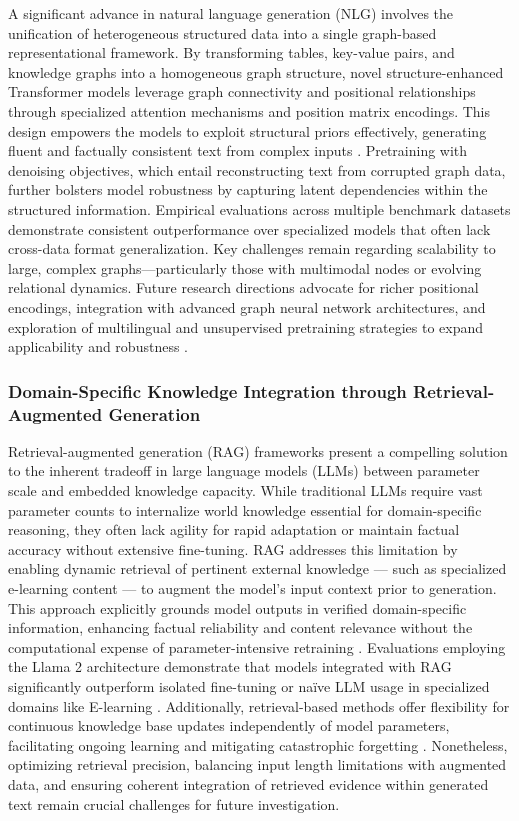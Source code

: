 A significant advance in natural language generation (NLG) involves the unification of heterogeneous structured data into a single graph-based representational framework. By transforming tables, key-value pairs, and knowledge graphs into a homogeneous graph structure, novel structure-enhanced Transformer models leverage graph connectivity and positional relationships through specialized attention mechanisms and position matrix encodings. This design empowers the models to exploit structural priors effectively, generating fluent and factually consistent text from complex inputs \cite{ref46}. Pretraining with denoising objectives, which entail reconstructing text from corrupted graph data, further bolsters model robustness by capturing latent dependencies within the structured information. Empirical evaluations across multiple benchmark datasets demonstrate consistent outperformance over specialized models that often lack cross-data format generalization. Key challenges remain regarding scalability to large, complex graphs---particularly those with multimodal nodes or evolving relational dynamics. Future research directions advocate for richer positional encodings, integration with advanced graph neural network architectures, and exploration of multilingual and unsupervised pretraining strategies to expand applicability and robustness \cite{ref46}.

\subsubsection{Domain-Specific Knowledge Integration through Retrieval-Augmented Generation}

Retrieval-augmented generation (RAG) frameworks present a compelling solution to the inherent tradeoff in large language models (LLMs) between parameter scale and embedded knowledge capacity. While traditional LLMs require vast parameter counts to internalize world knowledge essential for domain-specific reasoning, they often lack agility for rapid adaptation or maintain factual accuracy without extensive fine-tuning. RAG addresses this limitation by enabling dynamic retrieval of pertinent external knowledge --- such as specialized e-learning content --- to augment the model’s input context prior to generation. This approach explicitly grounds model outputs in verified domain-specific information, enhancing factual reliability and content relevance without the computational expense of parameter-intensive retraining \cite{ref8}. Evaluations employing the Llama 2 architecture demonstrate that models integrated with RAG significantly outperform isolated fine-tuning or naïve LLM usage in specialized domains like E-learning \cite{ref49}. Additionally, retrieval-based methods offer flexibility for continuous knowledge base updates independently of model parameters, facilitating ongoing learning and mitigating catastrophic forgetting \cite{ref49}. Nonetheless, optimizing retrieval precision, balancing input length limitations with augmented data, and ensuring coherent integration of retrieved evidence within generated text remain crucial challenges for future investigation.

